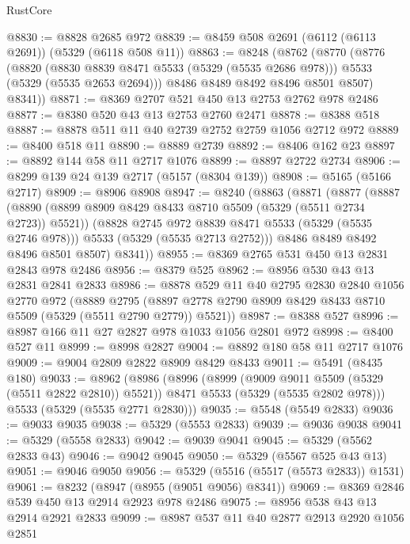 \begin{lexlean}{RustCore}
\begin{coremodule}
@8830 := @8828 @2685 @972
@8839 := @8459 @508 @2691 (@6112 (@6113 @2691)) (@5329 (@6118 @508 @11))
@8863 := @8248
    (@8762
      (@8770
        (@8776
          (@8820
            (@8830 @8839 @8471 @5533 (@5329 (@5535 @2686 @978)))
            @5533
            (@5329 (@5535 @2653 @2694)))
          @8486
          @8489
          @8492
          @8496
          @8501
          @8507)
        @8341))
@8871 := @8369 @2707 @521 @450 @13 @2753 @2762 @978 @2486
@8877 := @8380 @520 @43 @13 @2753 @2760 @2471
@8878 := @8388 @518
@8887 := @8878 @511 @11 @40 @2739 @2752 @2759 @1056 @2712 @972
@8889 := @8400 @518 @11
@8890 := @8889 @2739
@8892 := @8406 @162 @23
@8897 := @8892 @144 @58 @11 @2717 @1076
@8899 := @8897 @2722 @2734
@8906 := @8299 @139 @24 @139 @2717 (@5157 (@8304 @139))
@8908 := @5165 (@5166 @2717)
@8909 := @8906 @8908
@8947 := @8240
    (@8863
      (@8871
        (@8877
          (@8887
            (@8890 (@8899 @8909 @8429 @8433 @8710 @5509 (@5329 (@5511 @2734 @2723)) @5521))
            (@8828 @2745 @972 @8839 @8471 @5533 (@5329 (@5535 @2746 @978)))
            @5533
            (@5329 (@5535 @2713 @2752)))
          @8486
          @8489
          @8492
          @8496
          @8501
          @8507)
        @8341))
@8955 := @8369 @2765 @531 @450 @13 @2831 @2843 @978 @2486
@8956 := @8379 @525
@8962 := @8956 @530 @43 @13 @2831 @2841 @2833
@8986 := @8878
    @529
    @11
    @40
    @2795
    @2830
    @2840
    @1056
    @2770
    @972
    (@8889
      @2795
      (@8897 @2778 @2790 @8909 @8429 @8433 @8710 @5509 (@5329 (@5511 @2790 @2779)) @5521))
@8987 := @8388 @527
@8996 := @8987 @166 @11 @27 @2827 @978 @1033 @1056 @2801 @972
@8998 := @8400 @527 @11
@8999 := @8998 @2827
@9004 := @8892 @180 @58 @11 @2717 @1076
@9009 := @9004 @2809 @2822 @8909 @8429 @8433
@9011 := @5491 (@8435 @180)
@9033 := @8962
    (@8986
      (@8996
        (@8999 (@9009 @9011 @5509 (@5329 (@5511 @2822 @2810)) @5521))
        @8471
        @5533
        (@5329 (@5535 @2802 @978)))
      @5533
      (@5329 (@5535 @2771 @2830)))
@9035 := @5548 (@5549 @2833)
@9036 := @9033 @9035
@9038 := @5329 (@5553 @2833)
@9039 := @9036 @9038
@9041 := @5329 (@5558 @2833)
@9042 := @9039 @9041
@9045 := @5329 (@5562 @2833 @43)
@9046 := @9042 @9045
@9050 := @5329 (@5567 @525 @43 @13)
@9051 := @9046 @9050
@9056 := @5329 (@5516 (@5517 (@5573 @2833)) @1531)
@9061 := @8232 (@8947 (@8955 (@9051 @9056) @8341))
@9069 := @8369 @2846 @539 @450 @13 @2914 @2923 @978 @2486
@9075 := @8956 @538 @43 @13 @2914 @2921 @2833
@9099 := @8987
    @537
    @11
    @40
    @2877
    @2913
    @2920
    @1056
    @2851

\end{coremodule}
\end{lexlean}
